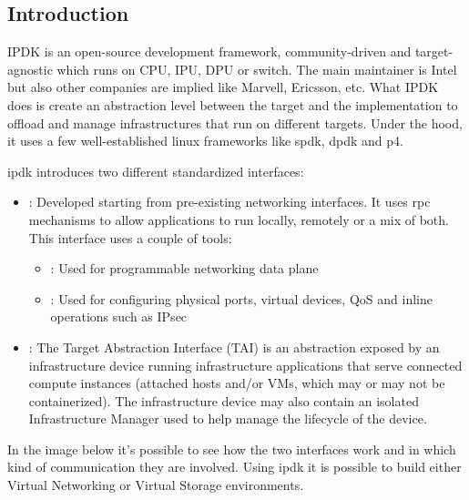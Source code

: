 \documentclass[../sn.tex]{subfiles}
\begin{document}
\subsection{Introduction}
IPDK is an open-source development framework, community-driven and target-agnostic which runs on CPU, IPU, DPU or switch.
The main maintainer is Intel but also other companies are implied like Marvell, Ericsson, etc.
What IPDK does is create an abstraction level between the target and the implementation to offload and manage infrastructures that run on different targets.
Under the hood, it uses a few well-established linux frameworks like \acrshort{spdk}, \acrshort{dpdk} and \acrshort{p4}.

\acrshort{ipdk} introduces two different standardized interfaces:
\begin{itemize}
    \item {}: Developed starting from pre-existing networking interfaces.
    It uses \acrshort{rpc} mechanisms to allow applications to run locally, remotely or a mix of both.
    This interface uses a couple of tools:
        \begin{itemize}
            \item {}: Used for programmable networking data plane
            \item {}: Used for configuring physical ports, virtual devices, QoS and inline operations such as IPsec
        \end{itemize}
    \item {}: The Target Abstraction Interface (TAI) is an abstraction exposed by an infrastructure device running infrastructure applications that serve connected compute instances (attached hosts and/or VMs, which may or may not be containerized).
    The infrastructure device may also contain an isolated Infrastructure Manager used to help manage the lifecycle of the device.
\end{itemize}
In the image below it's possible to see how the two interfaces work and in which kind of communication they are involved.
Using \acrshort{ipdk} it is possible to build either Virtual Networking or Virtual Storage environments.
\end{document}
